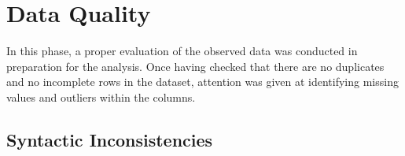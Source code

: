 \section{Data Quality}\label{sec:data_quality}
In this phase, a proper evaluation of the observed data was conducted in preparation for the analysis.
Once having checked that there are no duplicates and no incomplete rows in the dataset, 
attention was given at identifying missing values and outliers within the columns.



\subsection{Syntactic Inconsistencies}



